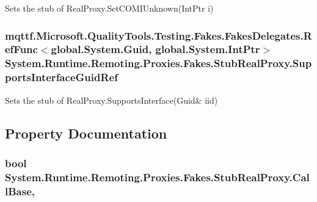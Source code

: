 Sets the stub of Real\-Proxy.\-Set\-C\-O\-M\-I\-Unknown(\-Int\-Ptr i)

\hypertarget{class_system_1_1_runtime_1_1_remoting_1_1_proxies_1_1_fakes_1_1_stub_real_proxy_a1f6700529baa5e3f58908d38c7db44af}{
\subsubsection[{Supports\-Interface\-Guid\-Ref}]{\setlength{\rightskip}{0pt plus 5cm}mqttf.\-Microsoft.\-Quality\-Tools.\-Testing.\-Fakes.\-Fakes\-Delegates.\-Ref\-Func$<$global.\-System.\-Guid, global.\-System.\-Int\-Ptr$>$ System.\-Runtime.\-Remoting.\-Proxies.\-Fakes.\-Stub\-Real\-Proxy.\-Supports\-Interface\-Guid\-Ref}}\label{class_system_1_1_runtime_1_1_remoting_1_1_proxies_1_1_fakes_1_1_stub_real_proxy_a1f6700529baa5e3f58908d38c7db44af}


Sets the stub of Real\-Proxy.\-Supports\-Interface(Guid\& iid)



\subsection{Property Documentation}
\hypertarget{class_system_1_1_runtime_1_1_remoting_1_1_proxies_1_1_fakes_1_1_stub_real_proxy_a7cd58d245af1eecab164a51b93e9f8dd}{
\subsubsection[{Call\-Base}]{\setlength{\rightskip}{0pt plus 5cm}bool System.\-Runtime.\-Remoting.\-Proxies.\-Fakes.\-Stub\-Real\-Proxy.\-Call\-Base\hspace{0.3cm}{\ttfamily [get]}, {\ttfamily [set]}}}\label{class_system_1_1_runtime_1_1_remoting_1_1_proxies_1_1_fakes_1_1_stub_real_proxy_a7cd58d245af1eecab164a51b93e9f8dd}


